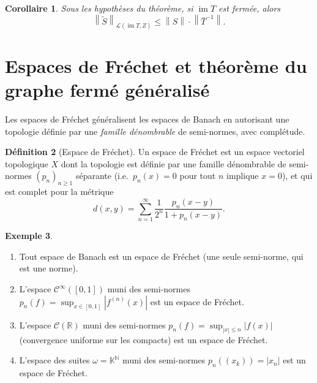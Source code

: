 \documentclass[a4paper,12pt]{book}
\DeclareMathOperator{\im}{im}
\newcommand{\N}{\mathbb{N}}
\newcommand{\R}{\mathbb{R}}
\newcommand{\K}{\mathbb{K}}
\newcommand{\norm}[1]{\left\| #1 \right\|}
\newcommand{\abs}[1]{\left| #1 \right|}
\theoremstyle{definition}
\newtheorem{definition}{Définition}[chapter]
\newtheorem{exemple}[definition]{Exemple}
\theoremstyle{plain}
\newtheorem{corollaire}[definition]{Corollaire}
\theoremstyle{remark}
\begin{document}
\begin{corollaire}
\label{cor:factorisation-noyaux}
Sous les hypothèses du théorème, si $\im T$ est fermée, alors
\[
  \norm{\tilde{S}}_{\mathcal{L}(\im T, Z)} \leq \norm{S} \cdot \norm{\bar{T}^{-1}}.
\]
\end{corollaire}


\section{Espaces de Fréchet et théorème du graphe fermé généralisé}
\label{sec:frechet}


Les espaces de Fréchet généralisent les espaces de Banach
en autorisant une topologie définie par une \emph{famille dénombrable} de semi-normes,
avec complétude.

\begin{definition}[Espace de Fréchet]
\label{def:frechet}
Un espace de Fréchet est un espace vectoriel topologique $X$ dont la topologie
est définie par une famille dénombrable de semi-normes
$(p_n)_{n \geq 1}$ séparante (i.e.\ $p_n(x) = 0$ pour tout $n$ implique $x = 0$),
et qui est complet pour la métrique
\[
  d(x,y) = \sum_{n=1}^{\infty} \frac{1}{2^n} \frac{p_n(x-y)}{1 + p_n(x-y)}.
\]
\end{definition}

\begin{exemple}
\label{ex:frechet-exemples}
\begin{enumerate}[label=(\roman*)]
  \item Tout espace de Banach est un espace de Fréchet (une seule semi-norme,
    qui est une norme).
  \item L'espace $\mathcal{C}^\infty([0,1])$ muni des semi-normes
    $p_n(f) = \sup_{x \in [0,1]} \abs{f^{(n)}(x)}$ est un espace de Fréchet.
  \item L'espace $\mathcal{C}(\R)$\index{$\mathcal{C}(\R)$} muni des semi-normes
    $p_n(f) = \sup_{\abs{x} \leq n} \abs{f(x)}$ (convergence uniforme
    sur les compacts)
    est un espace de Fréchet.
  \item L'espace des suites $\omega = \K^{\N}$\index{$\omega$} muni des semi-normes
    $p_n((x_k)) = \abs{x_n}$ est un espace de Fréchet.
\end{enumerate}
\end{exemple}
\end{document}
